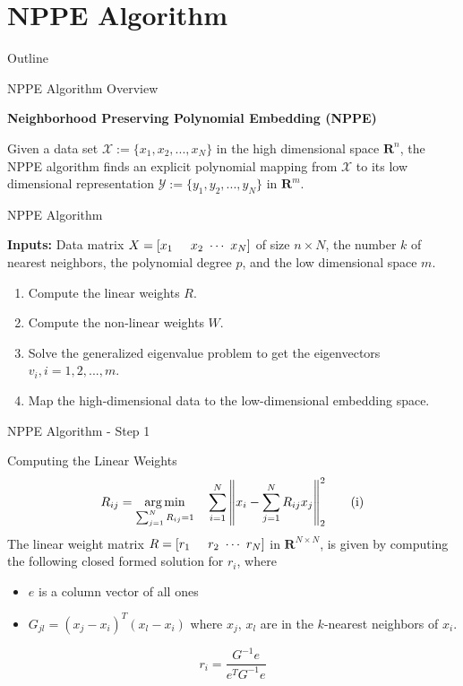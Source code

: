 \documentclass{beamer}
\DeclareMathOperator*{\argmin}{arg\,min}
\begin{document}
\section{NPPE Algorithm}
\begin{frame}{Outline}
\tableofcontents[current]
\end{frame}
\begin{frame}{NPPE Algorithm Overview}
\par \textbf{Neighborhood Preserving Polynomial Embedding (NPPE)}
\par Given a data set $\mathcal{X}:=\{x_1, x_2, ..., x_N\}$ in the high dimensional space $\mathbf{R} ^n$, the NPPE algorithm finds an explicit polynomial mapping from $\mathcal{X}$ to its low dimensional representation $\mathcal{Y}:=\{y_1, y_2, ..., y_N\}$ in $\mathbf{R}^m$.
\vspace{0.5cm}
\pause
\begin{block}{NPPE Algorithm}
\par \textbf{Inputs:} Data matrix $X=[x_1 \hspace{0.5cm} x_2 \text{ }\cdots\text{ } x_N]$ of size $n \times N$, the number $k$ of nearest neighbors, the polynomial degree $p$, and the low dimensional space $m$. 
\pause
\begin{enumerate}
\item Compute the linear weights $R$.
\item Compute the non-linear weights $W$.
\item Solve the generalized eigenvalue problem to get the eigenvectors $v_i, i=1,2,...,m$.
\item Map the high-dimensional data to the low-dimensional embedding space.
\end{enumerate}
\end{block}
\end{frame}

\begin{frame}{NPPE Algorithm - Step 1}
\begin{block}{Computing the Linear Weights}
\[R_{ij} = \argmin_{\sum_{j=1}^N{R_{ij}}=1}\quad\sum_{i=1}^N{\norm{x_i - \sum_{j=1}^N{R_{ij}x_j}}}_{2}^2 \tag{i}\]
The linear weight matrix $R=\left[r_1 \hspace{0.5cm} r_2 \text{ }\cdots\text{ } r_N\right]$ in $\mathbf{R}^{N \times N}$, is given by computing the following closed formed solution for $r_i$, where 
\begin{itemize}
    \item $e$ is a column vector of all ones 
    \item $G_{jl}=(x_j-x_i)^T(x_l-x_i)$ where $x_j,\,x_l$ are in the $k$-nearest neighbors of $x_i$. 
\end{itemize}
\begin{equation}
r_i = \frac{G^{-1}e}{e^TG^{-1}e}
\end{equation}
\end{block}
\end{frame}
\end{document}
